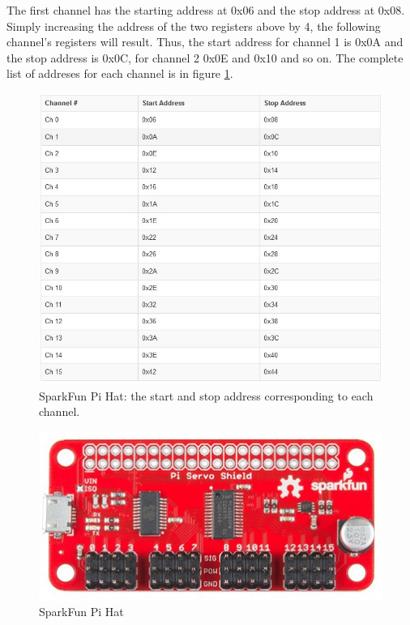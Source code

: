 \documentclass[runningheads,a4paper,12pt]{report}
\begin{document}
The first channel has the starting address at 0x06 and the stop address at 0x08. Simply increasing the address of the two registers above by 4, the following channel's registers will result. Thus, the start address for channel 1 is 0x0A and the stop address is 0x0C, for channel 2 0x0E and 0x10 and so on. The complete list of addreses for each channel is in figure \ref{fig:hat-addresses}.

\begin{figure}
	\centering

  	\includegraphics[width=\linewidth]{./images/3_hat_addresses}\hfill

    \caption{SparkFun Pi Hat: the start and stop address corresponding to each channel.}  
    \label{fig:hat-addresses}
\end{figure}

\begin{figure}
	\centering

  	\includegraphics[width=.6\linewidth]{./images/3_hat}\hfill

    \caption{SparkFun Pi Hat}  
    \label{fig:hat}
\end{figure}
\end{document}
